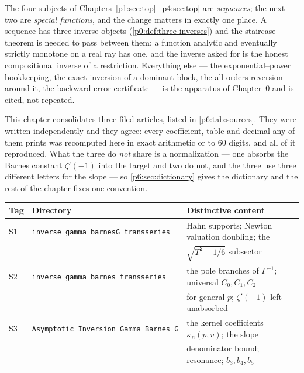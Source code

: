 \documentclass[11pt,a4paper,oneside]{book}
\theoremstyle{plain}
\theoremstyle{definition}
\theoremstyle{remark}
\begin{document}
The four subjects of Chapters~\ref{p1:sec:top}--\ref{p4:sec:top} are
\emph{sequences}; the next two are \emph{special functions}, and the change
matters in exactly one place.  A sequence has three inverse objects
(\cref{p0:def:three-inverses}) and the staircase theorem is needed to pass
between them; a function analytic and eventually strictly monotone on a real
ray has one, and the inverse asked for is the honest compositional inverse of
a restriction.  Everything else --- the exponential--power bookkeeping, the
exact inversion of a dominant block, the all-orders reversion around it, the
backward-error certificate --- is the apparatus of Chapter~0 and is cited, not
repeated.

\begin{sourcebox}
This chapter consolidates three filed articles, listed in
\cref{p6:tab:sources}.  They were written independently and they agree: every
coefficient, table and decimal any of them prints was recomputed here in exact
arithmetic or to $60$ digits, and all of it reproduced.  What the three do
\emph{not} share is a normalization --- one absorbs the Barnes constant
$\zeta'(-1)$ into the target and two do not, and the three use three different
letters for the slope --- so \cref{p6:sec:dictionary} gives the dictionary and
the rest of the chapter fixes one convention.

\begin{center}\small
\begin{tabular}{@{}lll@{}}
\toprule
Tag & Directory & Distinctive content\\
\midrule
S1 & \texttt{inverse\_\allowbreak gamma\_\allowbreak barnesG\_\allowbreak transseries} &
 Hahn supports; Newton valuation doubling; the\\
 & & $\sqrt{T^2+1/6}$ subsector\\
S2 & \texttt{inverse\_\allowbreak gamma\_\allowbreak barnes\_\allowbreak transseries} &
 the pole branches of $\Gamma^{-1}$; universal $C_0,C_1,C_2$\\
 & & for general $p$; $\zeta'(-1)$ left unabsorbed\\
S3 & \texttt{Asymptotic\_\allowbreak Inversion\_\allowbreak Gamma\_\allowbreak Barnes\_\allowbreak G} &
 the kernel coefficients $\kappa_n(p,v)$; the slope\\
 & & denominator bound; resonance; $b_3,b_4,b_5$\\
\bottomrule
\end{tabular}
\end{center}
\end{sourcebox}
\end{document}

